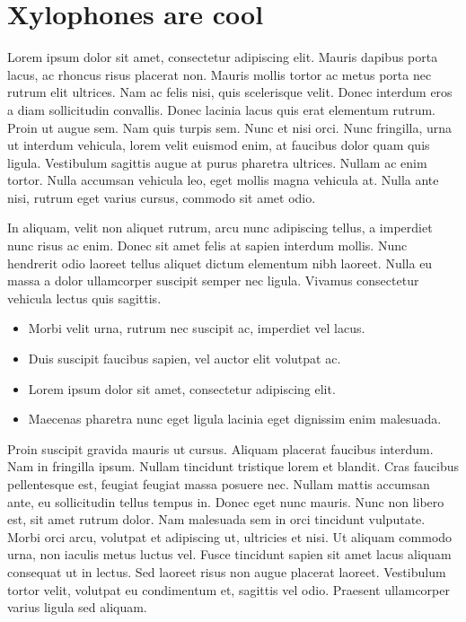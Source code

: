 \documentclass{article}
\begin{document}
\section{Xylophones are cool}\hypertarget{xylophones-are-cool}{}\label{xylophones-are-cool}

Lorem ipsum dolor sit amet, consectetur adipiscing elit. Mauris dapibus porta lacus, ac rhoncus risus placerat non. Mauris mollis tortor ac metus porta nec rutrum elit ultrices. Nam ac felis nisi, quis scelerisque velit. Donec interdum eros a diam sollicitudin convallis. Donec lacinia lacus quis erat elementum rutrum. Proin ut augue sem. Nam quis turpis sem. Nunc et nisi orci. Nunc fringilla, urna ut interdum vehicula, lorem velit euismod enim, at faucibus dolor quam quis ligula. Vestibulum sagittis augue at purus pharetra ultrices. Nullam ac enim tortor. Nulla accumsan vehicula leo, eget mollis magna vehicula at. Nulla ante nisi, rutrum eget varius cursus, commodo sit amet odio.


In aliquam, velit non aliquet rutrum, arcu nunc adipiscing tellus, a imperdiet nunc risus ac enim. Donec sit amet felis at sapien interdum mollis. Nunc hendrerit odio laoreet tellus aliquet dictum elementum nibh laoreet. Nulla eu massa a dolor ullamcorper suscipit semper nec ligula. Vivamus consectetur vehicula lectus quis sagittis.

\begin{itemize}
\item Morbi velit urna, rutrum nec suscipit ac, imperdiet vel lacus.
\item Duis suscipit faucibus sapien, vel auctor elit volutpat ac.
\item Lorem ipsum dolor sit amet, consectetur adipiscing elit.
\item Maecenas pharetra nunc eget ligula lacinia eget dignissim enim malesuada.
\end{itemize}

Proin suscipit gravida mauris ut cursus. Aliquam placerat faucibus interdum. Nam in fringilla ipsum. Nullam tincidunt tristique lorem et blandit. Cras faucibus pellentesque est, feugiat feugiat massa posuere nec. Nullam mattis accumsan ante, eu sollicitudin tellus tempus in. Donec eget nunc mauris. Nunc non libero est, sit amet rutrum dolor. Nam malesuada sem in orci tincidunt vulputate. Morbi orci arcu, volutpat et adipiscing ut, ultricies et nisi. Ut aliquam commodo urna, non iaculis metus luctus vel. Fusce tincidunt sapien sit amet lacus aliquam consequat ut in lectus. Sed laoreet risus non augue placerat laoreet. Vestibulum tortor velit, volutpat eu condimentum et, sagittis vel odio. Praesent ullamcorper varius ligula sed aliquam.
\end{document}
